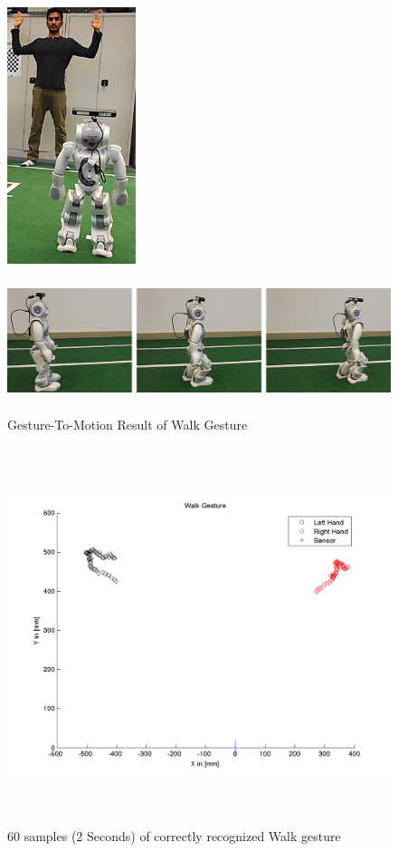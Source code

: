 \begin{figure}
	[h] 
	\begin{minipage}
		{1 
		\textwidth} \centering 
		\includegraphics[height=75mm]{figures/result/usr-walk.jpg} \caption*{} 
	\end{minipage}
	\begin{minipage}
		{1 
		\textwidth} 
		\includegraphics[height=42mm]{figures/result/nao-gm-walk.jpg} \caption*{} 
	\end{minipage}
	\caption{Gesture-To-Motion Result of Walk Gesture} \label{res:gm:walk} 
\end{figure}
\begin{figure}
	[h] \centering 
	\includegraphics[height=110mm]{figures/result/test-walk.jpg} \caption{60 samples (2 Seconds) of correctly recognized Walk gesture} 
	\label{res:pl:walk}
\end{figure}
